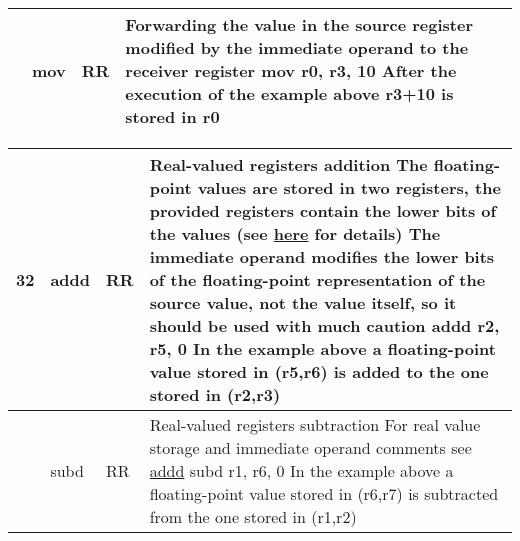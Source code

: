 \documentclass{article}
\newcommand{\St}[1]{{\fontfamily{qcr}\selectfont #1}}
\newcommand{\Ss}[1]{{\fontfamily{cmss}\selectfont #1}}
\begin{document}
{\begin{table*}[h!]
\begin{tabular}{| >{\centering\arraybackslash} m{1cm} | >{\centering\arraybackslash} m{1.4cm} | >{\centering\arraybackslash} m{1.2cm} | m{11.6cm} |}
 \hline
 
 24 & \St{mov} & \Ss{RR} &
 
 Forwarding the value in the source register modified by the immediate \newline
 operand to the receiver register \newline
 \St{mov r0, r3, 10} \newline
 After the execution of the example above \St{r3+10} is stored in \St{r0}\\
 
 \hline

\end{tabular}
\end{table*}
}

\newpage

{
\renewcommand{\arraystretch}{1.4}
\begin{table*}[h!]
\centering
\vspace{2mm}
\centering
\begin{tabular}{| >{\centering\arraybackslash} m{1cm} | >{\centering\arraybackslash} m{1.4cm} | >{\centering\arraybackslash} m{1.2cm} | m{11.6cm} |}

 \hline
 
 \hypertarget{addd}{} 32 &  \St{addd} & \Ss{RR} &
 
 Real-valued registers addition \newline
 The floating-point values are stored in two registers, the provided registers \newline
 contain the lower bits of the values (see \hyperlink{float:storage}{here} for details) \newline
 The immediate operand modifies the lower bits of the floating-point \newline
 representation of the source value, not the value itself, \newline
 so it should be used with much caution \newline
 \St{addd r2, r5, 0} \newline
 In the example above a floating-point value stored in \St{(r5,r6})\newline
 is added to the one stored in \St{(r2,r3})\\
 
 \hline
 
 33 & \St{subd} & \Ss{RR} &
 
 Real-valued registers subtraction \newline
 For real value storage and immediate operand comments see \hyperlink{addd}{\St{addd}} \newline
 \St{subd r1, r6, 0} \newline
 In the example above a floating-point value stored in \St{(r6,r7})\newline
 is subtracted from the one stored in \St{(r1,r2})\\
 

\end{tabular}
\end{table*}}
\end{document}
